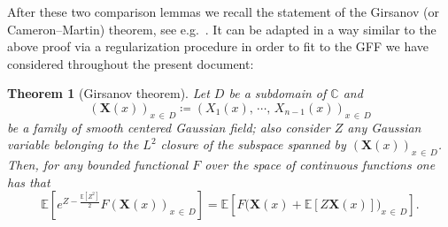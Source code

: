\documentclass[10pt]{amsart}
\newtheorem{theo}{Theorem}[section]
\theoremstyle{definition}\newtheorem{defi}[theo]{Definition}\newtheorem{rema}[theo]{Remark}\newtheorem{exam}[theo]{Example}\newtheorem{exem}[theo]{Example}\newtheorem{nota}[theo]{Notation}
\newcommand{\C}{\mathbb{C}}
\newcommand{\expect}[1]{\mathbb{E}\left[#1\right]}
\begin{document}
After these two comparison lemmas we recall the statement of the Girsanov (or Cameron--Martin) theorem, see e.g.~\cite[Chapter~VIII]{RY91}. It can be adapted in a way similar to the above proof via a regularization procedure in order to fit to the GFF we have considered throughout the present document:

\begin{theo}[Girsanov theorem]\label{Girsanov}
Let $D$ be a subdomain of $\C$ and
\[
\left(\bm X(x)\right)_{x\,\in\,D}\coloneqq \left(X_1(x),\,\cdots,\,X_{n-1}(x)\right)_{x\,\in\,D}
\]
be a family of smooth centered Gaussian field; also consider $Z$ any Gaussian variable belonging to the $L^2$ closure of the subspace spanned by $(\bm X(x))_{x\,\in\,D}$. Then, for any bounded functional $F$ over the space of continuous functions one has that
\[
\expect{e^{Z-\frac{\expect{Z^2}}{2}}F(\bm X(x))_{x\,\in\,D}}=\expect{F\big(\bm X(x)+\expect{Z\bm X(x)}\big)_{x\,\in\,D}}.
\]
\end{theo}
\end{document}
